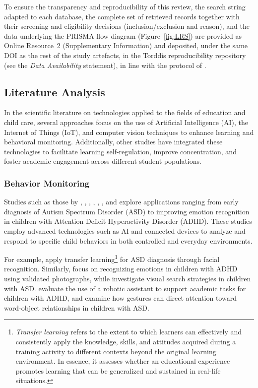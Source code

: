 To ensure the transparency and reproducibility of this review, the search string adapted to each database, the complete set of retrieved records together with their screening and eligibility decisions (inclusion/exclusion and reason), and the data underlying the PRISMA flow diagram (Figure~\ref{fig:LRS}) are provided as Online Resource~2 (Supplementary Information) and deposited, under the same DOI as the rest of the study artefacts, in the Torddis reproducibility repository (see the \textit{Data Availability} statement), in line with the protocol of \citet{Kitchenham2007Guidelines}.

\subsection{Literature Analysis}
In the scientific literature on technologies applied to the fields of education and child care, several approaches focus on the use of Artificial Intelligence (AI), the Internet of Things (IoT), and computer vision techniques to enhance learning and behavioral monitoring. Additionally, other studies have integrated these technologies to facilitate learning self-regulation, improve concentration, and foster academic engagement across different student populations.

\subsubsection{Behavior Monitoring}
Studies such as those by \cite{Akter2021}, \cite{Albrecht2014}, \cite{Berrezueta-Guzman2021}, \cite{Pelc2006}, \cite{VilliersRader2021}, \cite{Warren2015Brief}, and \cite{Washington2016AWereable} explore applications ranging from early diagnosis of Autism Spectrum Disorder (ASD) to improving emotion recognition in children with Attention Deficit Hyperactivity Disorder (ADHD). These studies employ advanced technologies such as AI and connected devices to analyze and respond to specific child behaviors in both controlled and everyday environments.

For example, \cite{Akter2021} apply transfer learning\footnote{\textit{Transfer learning \cite{Akter2021}} refers to the extent to which learners can effectively and consistently apply the knowledge, skills, and attitudes acquired during a training activity to different contexts beyond the original learning environment. In essence, it assesses whether an educational experience promotes learning that can be generalized and sustained in real-life situations.} for ASD diagnosis through facial recognition. Similarly, \cite{Pelc2006} focus on recognizing emotions in children with ADHD using validated photographs, while \cite{Albrecht2014} investigate visual search strategies in children with ASD. \cite{Berrezueta-Guzman2021} evaluate the use of a robotic assistant to support academic tasks for children with ADHD, and \cite{VilliersRader2021} examine how gestures can direct attention toward word-object relationships in children with ASD.

